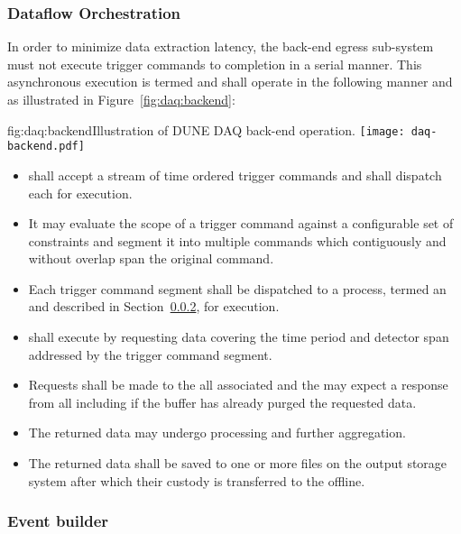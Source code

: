 \subsubsection{Dataflow Orchestration}

In order to minimize data extraction latency, the back-end egress sub-system must not execute trigger commands to completion in a serial manner. 
This asynchronous execution is termed  and shall operate in the following manner and as illustrated in Figure~\ref{fig:daq:backend}:

\begin{dunefigure}{fig:daq:backend}{Illustration of DUNE DAQ back-end operation.}
  \texttt{[image: daq-backend.pdf]}
\end{dunefigure}

\begin{itemize}
\item {} shall accept a stream of time ordered trigger commands and shall dispatch each for execution.
\item It may evaluate the scope of a trigger command against a configurable set of constraints and segment it into multiple commands which contiguously and without overlap span the original command.
\item Each trigger command segment shall be dispatched to a process, termed an  and described in Section~\ref{sec:fd-daq:design-event-builder}, for execution.
\item {} shall execute by requesting data covering the time period and detector span addressed by the trigger command segment.
\item Requests shall be made to the all associated  and the  may expect a response from all including if the buffer has already purged the requested data.
\item The returned data may undergo processing and further aggregation.
\item The returned data shall be saved to one or more files on the output storage system after which their custody is transferred to the offline.
\end{itemize}



\subsubsection{Event builder}
\label{sec:fd-daq:design-event-builder}

